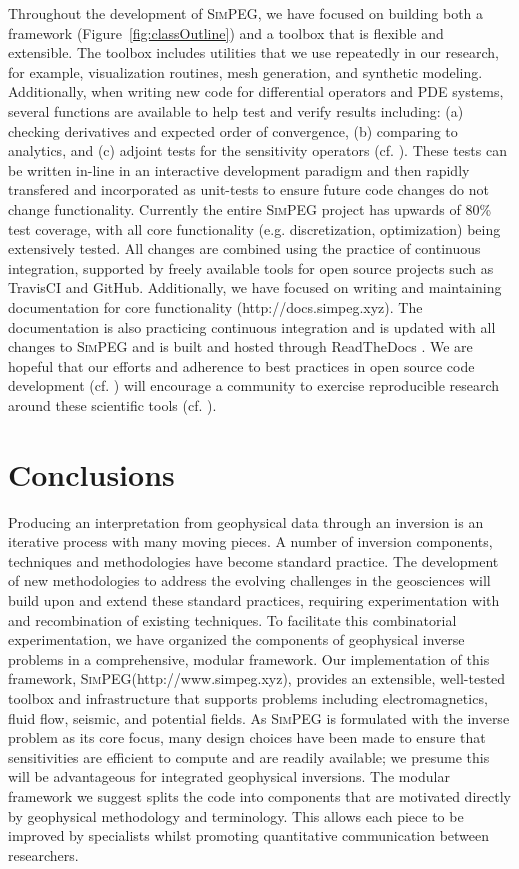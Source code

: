 \documentclass[preprint,review,3p,times,onecolumn,authoryear]{elsarticle}
\newcommand{\SimPEG}{\textsc{SimPEG}\xspace}
\begin{document}
Throughout the development of \SimPEG, we have focused on building both a framework (Figure~\ref{fig:classOutline}) and a toolbox that is flexible and extensible.
The toolbox includes utilities that we use repeatedly in our research, for example, visualization routines, mesh generation, and synthetic modeling.
Additionally, when writing new code for differential operators and PDE systems, several functions are available to help test and verify results including: (a) checking derivatives and expected order of convergence, (b) comparing to analytics, and (c) adjoint tests for the sensitivity operators (cf. \cite{haber2015computational}).
These tests can be written in-line in an interactive development paradigm and then rapidly transfered and incorporated as unit-tests to ensure future code changes do not change functionality.
Currently the entire \SimPEG project has upwards of 80\% test coverage,  with all core functionality (e.g. discretization, optimization) being extensively tested.
All changes are combined using the practice of continuous integration, supported by freely available tools for open source projects such as TravisCI and GitHub.
Additionally, we have focused on writing and maintaining documentation for core functionality (http://docs.simpeg.xyz). The documentation is also practicing continuous integration and is updated with all changes to \SimPEG and is built and hosted through ReadTheDocs \citep{RTFD}.
We are hopeful that our efforts and adherence to best practices in open source code development (cf. \cite{Wilson2014}) will encourage a community to exercise reproducible research around these scientific tools (cf. \cite{Fomel2009}).


\section{Conclusions}
\label{sec:conclusions}

Producing an interpretation from geophysical data through an inversion is an iterative process with many moving pieces. A number of inversion components, techniques and methodologies have become standard practice. The development of new methodologies to address the evolving challenges in the geosciences will build upon and extend these standard practices, requiring experimentation with and recombination of existing techniques.
To facilitate this combinatorial experimentation, we have organized the components of geophysical inverse problems in a comprehensive, modular framework. Our implementation of this framework, \SimPEG (http://www.simpeg.xyz), provides an extensible, well-tested toolbox and infrastructure that supports problems including electromagnetics, fluid flow, seismic, and potential fields. As \SimPEG is formulated with the inverse problem as its core focus, many design choices have been made to ensure that sensitivities are efficient to compute and are readily available; we presume this will be advantageous for integrated geophysical inversions. The modular framework we suggest splits the code into components that are motivated directly by geophysical methodology and terminology. This allows each piece to be improved by specialists whilst promoting quantitative communication between researchers.
\end{document}
